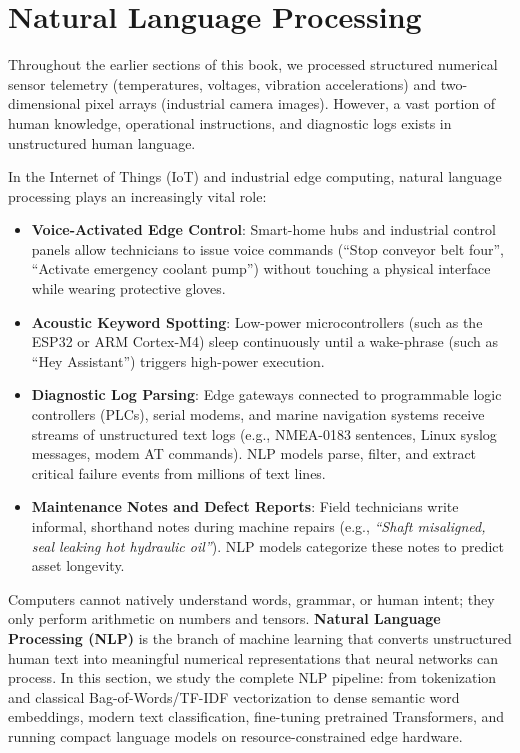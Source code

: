 \section{Natural Language Processing}\label{sec:nlp}

Throughout the earlier sections of this book, we processed structured numerical sensor telemetry (temperatures, voltages, vibration accelerations) and two-dimensional pixel arrays (industrial camera images). However, a vast portion of human knowledge, operational instructions, and diagnostic logs exists in unstructured human language.

In the Internet of Things (IoT) and industrial edge computing, natural language processing plays an increasingly vital role:
\begin{itemize}
    \item \textbf{Voice-Activated Edge Control}: Smart-home hubs and industrial control panels allow technicians to issue voice commands (``Stop conveyor belt four'', ``Activate emergency coolant pump'') without touching a physical interface while wearing protective gloves.
    \item \textbf{Acoustic Keyword Spotting}: Low-power microcontrollers (such as the ESP32 or ARM Cortex-M4) sleep continuously until a wake-phrase (such as ``Hey Assistant'') triggers high-power execution.
    \item \textbf{Diagnostic Log Parsing}: Edge gateways connected to programmable logic controllers (PLCs), serial modems, and marine navigation systems receive streams of unstructured text logs (e.g., NMEA-0183 sentences, Linux syslog messages, modem AT commands). NLP models parse, filter, and extract critical failure events from millions of text lines.
    \item \textbf{Maintenance Notes and Defect Reports}: Field technicians write informal, shorthand notes during machine repairs (e.g., \emph{``Shaft misaligned, seal leaking hot hydraulic oil''}). NLP models categorize these notes to predict asset longevity.
\end{itemize}

Computers cannot natively understand words, grammar, or human intent; they only perform arithmetic on numbers and tensors. \textbf{Natural Language Processing (NLP)} is the branch of machine learning that converts unstructured human text into meaningful numerical representations that neural networks can process. In this section, we study the complete NLP pipeline: from tokenization and classical Bag-of-Words/TF-IDF vectorization to dense semantic word embeddings, modern text classification, fine-tuning pretrained Transformers, and running compact language models on resource-constrained edge hardware.

